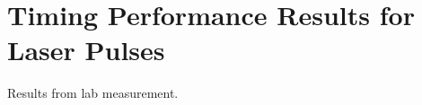 \section{Timing Performance Results for Laser Pulses}
\label{sec:lasertiming}


Results from lab measurement.
